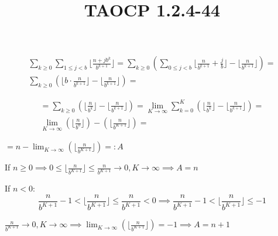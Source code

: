 \documentclass{article}
\title{TAOCP 1.2.4\mbox{-}44}
\begin{document}
\maketitle

\begin{multline*}
\sum_{k \geq 0}\sum_{1 \leq j < b} \lfloor{\frac{n + jb^{k}}{b^{k+1}}}\rfloor = \sum_{k \geq 0}(\sum_{0 \leq j < b} \lfloor{\frac{n}{b^{k+1}} + \frac{j}{b}}\rfloor - \lfloor{\frac{n}{b^{k+1}}}\rfloor) = \\
\sum_{k \geq 0}(\lfloor{b \cdot \frac{n}{b^{k+1}}}\rfloor - \lfloor{\frac{n}{b^{k+1}}}\rfloor) =
\end{multline*}

\begin{multline*}
= \sum_{k \geq 0}(\lfloor{\frac{n}{b^{k}}}\rfloor - \lfloor{\frac{n}{b^{k+1}}}\rfloor) = \lim_{K \to \infty} \sum_{k = 0}^{K}(\lfloor{\frac{n}{b^{k}}}\rfloor - \lfloor{\frac{n}{b^{k+1}}}\rfloor) = \\
\lim_{K \to \infty}(\lfloor{\frac{n}{b^{0}}}\rfloor) - (\lfloor{\frac{n}{b^{K+1}}}\rfloor) =
\end{multline*}

\( = n - \lim_{K \to \infty} (\lfloor{\frac{n}{b^{K+1}}}\rfloor) =: A \)

If \( n \geq 0 \implies 0 \leq \lfloor{\frac{n}{b^{K+1}}}\rfloor \leq \frac{n}{b^{K + 1}} \to 0, K \to \infty \implies A = n \)

If \( n < 0 \):
\[ \frac{n}{b^{K+1}} - 1 <\lfloor{\frac{n}{b^{K+1}}}\rfloor \leq \frac{n}{b^{K+1}} < 0 \implies \frac{n}{b^{K+1}} - 1 <\lfloor{\frac{n}{b^{K+1}}}\rfloor \leq -1 \]

\( \frac{n}{b^{K+1}} \to 0, K \to \infty \implies \lim_{K \to \infty} (\lfloor{\frac{n}{b^{K+1}}}\rfloor) = -1 \implies A = n + 1 \)
\end{document}
